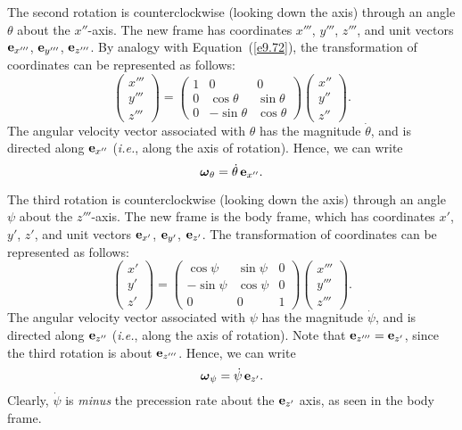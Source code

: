 The second rotation is counterclockwise (looking down the axis) through
an angle $\theta$ about the $x''$-axis. The new frame has coordinates
$x'''$, $y'''$, $z'''$, and unit vectors ${\bf e}_{x'''}$, ${\bf e}_{y'''}$, ${\bf e}_{z'''}$. By analogy with Equation~(\ref{e9.72}), the transformation
of coordinates can be represented as follows:
\begin{equation}
\left(\begin{array}{c}x'''\\y'''\\z'''\end{array}\right)=
\left(\begin{array}{ccc}
1&0&0\\
0&\cos\theta&\sin\theta\\
0&-\sin\theta&\cos\theta
\end{array}\right)\left(\begin{array}{c}x''\\y''\\z''\end{array}\right).
\end{equation}
The angular velocity vector associated with $\theta$ has the magnitude $\dot{\theta}$, 
and is directed along ${\bf e}_{x''}$ ({\em i.e.}, along the axis of rotation).
Hence, we can write
\begin{equation}\label{e9.75}
\mbox{\boldmath$\omega$}_\theta = \dot{\theta}\,{\bf e}_{x''}.
\end{equation}

The third rotation is counterclockwise (looking down the axis) through
an angle $\psi$ about the $z'''$-axis. The new frame is the body frame, which has coordinates
$x'$, $y'$, $z'$, and unit vectors ${\bf e}_{x'}$, ${\bf e}_{y'}$, ${\bf e}_{z'}$. The transformation of coordinates can be represented as
follows:
\begin{equation}
\left(\begin{array}{c}x'\\y'\\z'\end{array}\right)=
\left(\begin{array}{ccc}
\cos\psi&\sin\psi&0\\
-\sin\psi&\cos\psi&0\\
0&0&1
\end{array}\right)\left(\begin{array}{c}x'''\\y'''\\z'''\end{array}\right).
\end{equation}
The angular velocity vector associated with $\psi$ has the magnitude $\dot{\psi}$, 
and is directed along ${\bf e}_{z''}$ ({\em i.e.}, along the axis of rotation).
Note that ${\bf e}_{z'''}={\bf e}_{z'}$, since the third rotation is about
${\bf e}_{z'''}$.
Hence, we can write
\begin{equation}\label{e9.77}
\mbox{\boldmath$\omega$}_\psi= \dot{\psi}\,{\bf e}_{z'}.
\end{equation}
Clearly, $\dot{\psi}$ is {\em minus}\/ the precession rate about the ${\bf e}_{z'}$ axis, as seen in the body frame.

